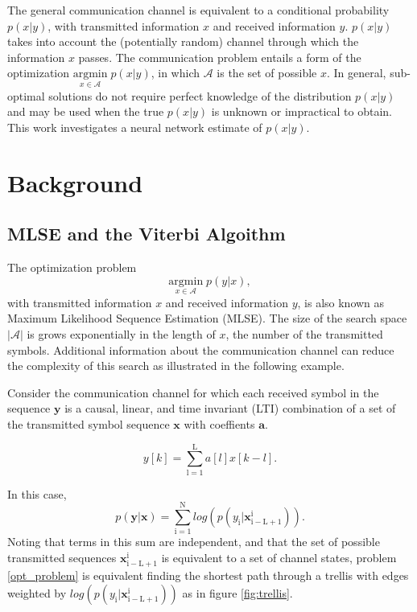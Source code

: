 \documentclass[12pt,a4paper]{article}
\begin{document}
The general communication channel is equivalent to a conditional probability $p(x|y)$, with transmitted information $x$ and received information $y$.  $p(x|y)$ takes into account the (potentially random) channel through which the information $x$ passes. The communication problem entails a form of the optimization $\underset{x\in\mathcal{A}}{\text{argmin}} \; p(x|y)$, in which $\mathcal{A}$ is the set of possible $x$. In general, sub-optimal solutions do not require perfect knowledge of the distribution $p(x|y)$ and may be used when the true $p(x|y)$ is unknown or impractical to obtain. This work investigates a neural network estimate of $p(x|y)$.

\section{Background}

\subsection{MLSE and the Viterbi Algoithm}
The optimization problem
\begin{equation}\label{opt_problem}
\underset{x \in \textit{$\mathcal{A}$}}{\text{argmin}} \; p(y|x),
\end{equation}
 with transmitted information $x$ and received information $y$, is also known as Maximum Likelihood Sequence Estimation (MLSE). 
The size of the search space $|\mathcal{A}|$ is grows exponentially in the length of $x$, the number of the transmitted symbols. Additional information about the communication channel can reduce the complexity of this search as illustrated in the following example.
\par
Consider the communication channel for which each received symbol in the sequence $\mathbf{y}$ is a causal, linear, and time invariant (LTI) combination of a set of the transmitted symbol sequence $\mathbf{x}$ with coeffients $\mathbf{a}$. 

\begin{equation*}
y[k] = \sum_{\mathrm{l=1}}^{\mathrm{L}} a[l]x[k-l].
\end{equation*}

In this case,
\begin{equation*}
p(\mathbf{y}|\mathbf{x})=\sum_{\mathrm{i=1}}^{\mathrm{N}}log(p(y_{\mathrm{i}}|\mathbf{x}_{\mathrm{i-L+1}}^{\mathrm{i}}) ).
\end{equation*}
Noting that terms in this sum are independent, and that the set of possible transmitted sequences $\mathbf{x}_{\mathrm{i-L+1}}^{\mathrm{i}}$ is equivalent to a set of channel states, problem \eqref{opt_problem} is equivalent finding the shortest path through a trellis  with edges weighted by $log(p(y_{\mathrm{i}}|\mathbf{x}_{\mathrm{i-L+1}}^{\mathrm{i}}))$ as in figure \ref{fig:trellis}.
\end{document}
